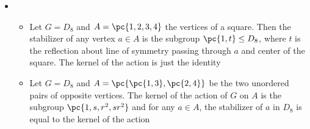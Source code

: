 \documentclass[11pt]{article}
\begin{document}
\begin{definition*}
\begin{itemize}
        \item {}
        \begin{itemize}
            \item Let $G=D_8$ and $A =\pc{1,2,3,4}$ the vertices of a square. Then the stabilizer of any vertex $a\in A$ is the subgroup $\pc{1,t} \subgroup D_8$, where $t$ is the reflection about line of symmetry passing through $a$ and center of the square. The kernel of the action is just the identity
            \item Let $G=D_8$ and $A = \pc{\pc{1,3}, \pc{2,4}}$ be the two unordered pairs of opposite vertices. The kernel of the action of $G$ on $A$ is the subgroup $\pc{1,s,r^2,sr^2}$ and for any $a\in A$, the stabilizer of $a$ in $D_8$ is equal to the kernel of the action
        \end{itemize}
    \end{itemize}
\end{definition*}
\end{document}
